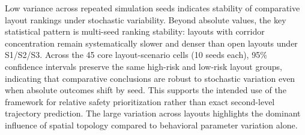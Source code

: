 \documentclass[nolineno]{ieeeaccess}
\begin{document}
Low variance across repeated simulation seeds indicates stability of comparative layout rankings under stochastic variability.
Beyond absolute values, the key statistical pattern is multi-seed ranking stability: layouts with corridor concentration remain systematically slower and denser than open layouts under S1/S2/S3. Across the 45 core layout-scenario cells (10 seeds each), 95\% confidence intervals preserve the same high-risk and low-risk layout groups, indicating that comparative conclusions are robust to stochastic variation even when absolute outcomes shift by seed. This supports the intended use of the framework for relative safety prioritization rather than exact second-level trajectory prediction.
The large variation across layouts highlights the dominant influence of spatial topology compared to behavioral parameter variation alone.
\end{document}

